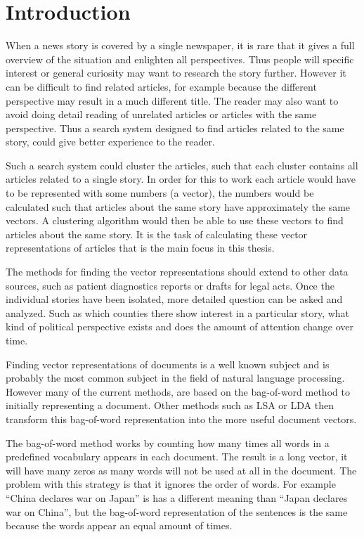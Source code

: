 \chapter{Introduction}

When a news story is covered by a single newspaper, it is rare that it gives a full overview of the situation and enlighten all perspectives. Thus people will specific interest or general curiosity may want to research the story further. However it can be difficult to find related articles, for example because the different perspective may result in a much different title. The reader may also want to avoid doing detail reading of unrelated articles or articles with the same perspective. Thus a search system designed to find articles related to the same story, could give better experience to the reader.

Such a search system could cluster the articles, such that each cluster contains all articles related to a single story. In order for this to work each article would have to be represented with some numbers (a vector), the numbers would be calculated such that articles about the same story have approximately the same vectors. A clustering algorithm would then be able to use these vectors to find articles about the same story. It is the task of calculating these vector representations of articles that is the main focus in this thesis.

The methods for finding the vector representations should extend to other data sources, such as patient diagnostics reports or drafts for legal acts. Once the individual stories have been isolated, more detailed question can be asked and analyzed. Such as which counties there show interest in a particular story, what kind of political perspective exists and does the amount of attention change over time. 

Finding vector representations of documents is a well known subject and is probably the most common subject in the field of natural language processing. However many of the current methods, are based on the bag-of-word method to initially representing a document. Other methods such as LSA or LDA then transform this bag-of-word representation into the more useful document vectors.

The bag-of-word method works by counting how many times all words in a predefined vocabulary appears in each document. The result is a long vector, it will have many zeros as many words will not be used at all in the document. The problem with this strategy is that it ignores the order of words. For example ``China declares war on Japan'' is has a different meaning than ``Japan declares war on China'', but the bag-of-word representation of the sentences is the same because the words appear an equal amount of times.

